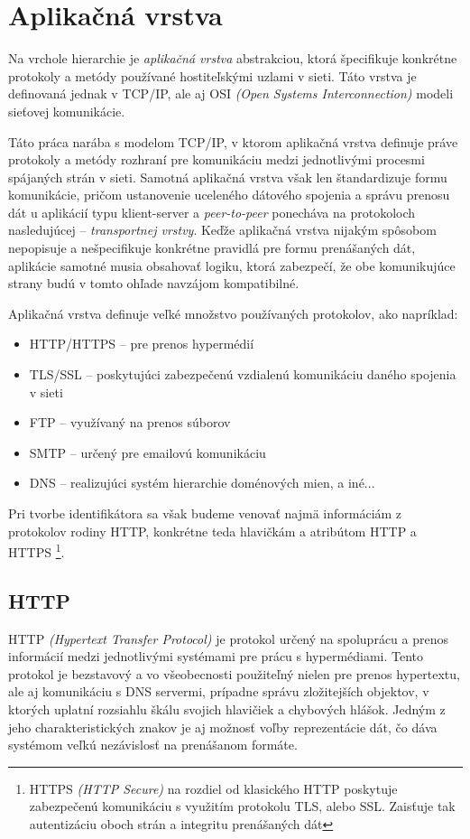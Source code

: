 \documentclass[
  digital, %
  table,   %
  lof,     %
  nolot,   %
  nocover
]{fithesis3}
\begin{document}
\section{Aplikačná vrstva}
Na vrchole hierarchie je \textit{aplikačná vrstva} abstrakciou, ktorá špecifikuje
konkrétne protokoly a metódy používané hostiteľskými uzlami v sieti. Táto
vrstva je definovaná jednak v TCP/IP, ale aj OSI
\textit{(Open Systems Interconnection)} modeli sieťovej komunikácie.

Táto práca narába s modelom TCP/IP, v ktorom aplikačná vrstva definuje práve
protokoly a metódy rozhraní pre komunikáciu medzi jednotlivými procesmi
spájaných strán v sieti. Samotná aplikačná vrstva však len štandardizuje formu
komunikácie, pričom ustanovenie uceleného dátového spojenia a správu prenosu dát
u aplikácií typu klient-server a \textit{peer-to-peer} ponecháva na protokoloch
nasledujúcej -- \textit{transportnej vrstvy}. Keďže aplikačná vrstva nijakým spôsobom
nepopisuje a nešpecifikuje konkrétne pravidlá pre formu prenášaných dát,
aplikácie samotné musia obsahovať logiku, ktorá zabezpečí, že obe komunikujúce
strany budú v tomto ohľade navzájom kompatibilné.

Aplikačná vrstva definuje veľké množstvo používaných protokolov, ako napríklad:
\begin{itemize}
	\item HTTP/HTTPS -- pre prenos hypermédií 
	\item TLS/SSL -- poskytujúci zabezpečenú vzdialenú komunikáciu daného spojenia v sieti
	\item FTP -- využívaný na prenos súborov
	\item SMTP -- určený pre emailovú komunikáciu
	\item DNS -- realizujúci systém hierarchie doménových mien, a iné...
\end{itemize}
Pri tvorbe identifikátora sa však budeme venovať najmä informáciám z protokolov
rodiny HTTP, konkrétne teda hlavičkám a atribútom HTTP a HTTPS \footnote{HTTPS 
\textit{(HTTP Secure)} na rozdiel od klasického HTTP poskytuje zabezpečenú komunikáciu
s využitím protokolu TLS, alebo SSL. Zaisťuje tak autentizáciu oboch strán a integritu prenášaných dát}.

\subsection{HTTP}
HTTP \textit{(Hypertext Transfer Protocol)} je protokol určený
na spoluprácu a prenos informácií medzi jednotlivými systémami pre
prácu s hypermédiami. Tento protokol je bezstavový a vo všeobecnosti
použiteľný nielen pre prenos hypertextu, ale aj komunikáciu s DNS servermi, prípadne
správu zložitejších objektov, v ktorých uplatní rozsiahlu škálu svojich
hlavičiek a chybových hlášok. Jedným z jeho charakteristických znakov je aj
možnosť voľby reprezentácie dát, čo dáva systémom veľkú nezávislosť na
prenášanom formáte.
\end{document}

